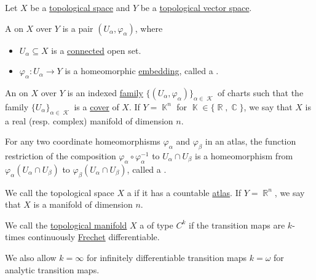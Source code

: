\begin{definition}\label{def:atlas}
  Let \( X \) be a \hyperref[def:topological_space]{topological space} and \( Y \) be a \hyperref[def:topological_vector_space]{topological vector space}.

  A  on \( X \) over \( Y \) is a pair \( (U_\alpha, \varphi_\alpha) \), where
  \begin{itemize}
    \item \( U_\alpha \subseteq X \) is a \hyperref[def:connected_space]{connected} open set.
    \item \( \varphi_\alpha: U_\alpha \to Y \) is a homeomorphic \hyperref[def:homeomorphism]{embedding}, called a .
  \end{itemize}

  An  on \( X \) over \( Y \) is an indexed \hyperref[def:cartesian_product/indexed_family]{family} \( \{ (U_\alpha, \varphi_\alpha) \}_{\alpha \in \mscrK} \) of charts such that the family \( \{ U_\alpha \}_{\alpha \in \mscrK} \) is a \hyperref[def:set_partition]{cover} of \( X \). If \( Y = \BbbK^n \) for \( \BbbK \in \{ \BbbR, \BbbC \} \), we say that \( X \) is a real (resp. complex) manifold of dimension \( n \).

  For any two coordinate homeomorphisms \( \varphi_\alpha \) and \( \varphi_\beta \) in an atlas, the function restriction of the composition \( \varphi_\alpha \circ \varphi_\alpha^{-1} \) to \( U_\alpha \cap U_\beta \) is a homeomorphism from \( \varphi_\alpha(U_\alpha \cap U_\beta) \) to \( \varphi_\beta(U_\alpha \cap U_\beta) \), called a .
\end{definition}

\begin{definition}\label{def:topological_manifold}
  We call the topological space \( X \) a  if it has a countable \hyperref[def:atlas]{atlas}. If \( Y = \BbbR^n \), we say that \( X \) is a manifold of dimension \( n \).
\end{definition}

\begin{definition}\label{def:differentiable_manifold}
  We call the \hyperref[def:topological_manifold]{topological manifold} \( X \) a  of type \( C^k \) if the transition maps are \( k \)-times continuously \hyperref[def:differentiability/frechet]{Frechet} differentiable.

  We also allow \( k = \infty \) for infinitely differentiable transition maps \( k = \omega \) for analytic transition maps.
\end{definition}
